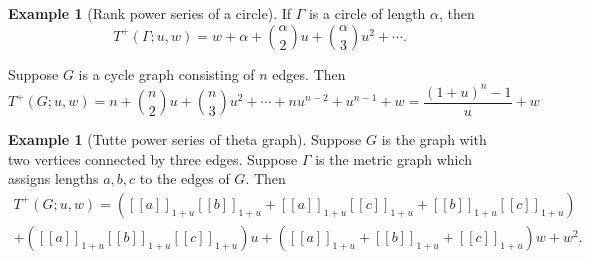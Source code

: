 \documentclass{amsart}
\theoremstyle{definition}
\newtheorem{eg}[thm]{Example}
\newcommand{\fanalog}[2]{[\![#2]\!]_{#1}}
\begin{document}
\begin{eg}[Rank power series of a circle]
If $\Gamma$ is a circle of length $\alpha$, then 
\[
	T^+(\Gamma;u,w) = w + \alpha + \binom{\alpha}{2} u + \binom{\alpha}{3} u^2 + \cdots .
\]

Suppose $G$ is a cycle graph consisting of $n$ edges.
Then
$$
T^+(G;u,w) = n + \binom{n}{2}u + \binom{n}{3} u^2 + \cdots + nu^{n-2} + u^{n-1} + w
= \frac{(1+u)^n-1}{u} + w
$$
\end{eg}

\begin{eg}[Tutte power series of theta graph]
Suppose $G$ is the graph with two vertices connected by three edges.
Suppose $\Gamma$ is the metric graph which assigns lengths $a,b,c$ to the edges of $G$.
Then
\begin{multline*}
T^+(G;u,w) = ( \fanalog{1 + u}{a} \fanalog{1 + u}{b} + \fanalog{1 + u}{a} \fanalog{1 + u}{c} + \fanalog{1 + u}{b} \fanalog{1 + u}{c} ) \\
+ ( \fanalog{1 + u}{a} \fanalog{1 + u}{b} \fanalog{1 + u}{c} ) u 
+ (\fanalog{1 + u}{a} + \fanalog{1 + u}{b} + \fanalog{1 + u}{c}) w + w^2 .
\end{multline*}

\end{eg}
\end{document}
